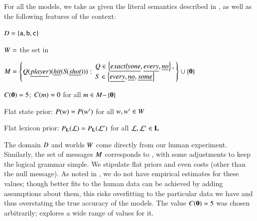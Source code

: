 \documentclass[leqno,12pt]{article}
\begin{document}
For all the models, we take as given the literal semantics described
in , as well as the following features of the
context:
%
\begin{examples}
\item\label{expmod}
  \begin{examples}
  \item $D = \left\{ \texttt{a}, \texttt{b}, \texttt{c} \right\}$
  \item $W = $ the set in 


  \item\label{expformulae} $\Messages =
    \setlength{\arraycolsep}{2pt}
    \set{
      Q(\word{player})(\word{hit}(S\negthinspace(\word{shot}))) :
      \begin{array}{l}        
        Q \in \set{\word{exactly one}, \word{every}, \word{no}}, \\
        S \in \set{\word{every}, \word{no}, \word{some}}
      \end{array}} \cup \set{\nullmsg}$
  \item $C(\mathbf{0}) = 5$; $C(m) = 0$ for all $m \in M{-}\left\{ \mathbf{0} \right\}$  
  \item Flat state prior: $P(w) = P(w')$ for all $w, w' \in W$
  \item Flat lexicon prior: $P_{\mathbf{L}}(\mathcal{L}) = P_{\mathbf{L}}(\mathcal{L}')$ for all $\mathcal{L}, \mathcal{L}' \in \mathbf{L}$
  \end{examples}
\end{examples}


The domain $D$ and worlds $W$ come directly from our human
experiment. Similarly, the set of messages $M$ corresponds to
, with some adjustments to keep the logical grammar
simple. We stipulate flat priors and even costs (other than the null
message). As noted in , we do not have empirical
estimates for these values; though better fits to the human data can
be achieved by adding assumptions about them, this risks overfitting
to the particular data we have and thus overstating the true accuracy
of the models. The value $C(\mathbf{0}) = 5$ was chosen
arbitrarily;  explores a wide range of
values for it.
\end{document}
